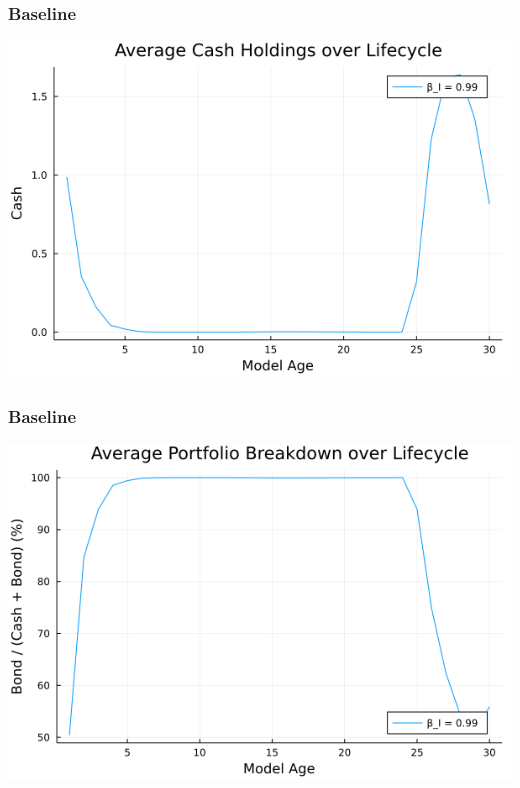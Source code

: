 \documentclass{beamer}
\begin{document}
\begin{frame}
\frametitle{Baseline}

\begin{center}
\includegraphics[scale = 0.5]{cash}
\end{center}

\end{frame}


\begin{frame}
\frametitle{Baseline}

\begin{center}
\includegraphics[scale = 0.5]{portfolio}
\end{center}

\end{frame}
\end{document}
